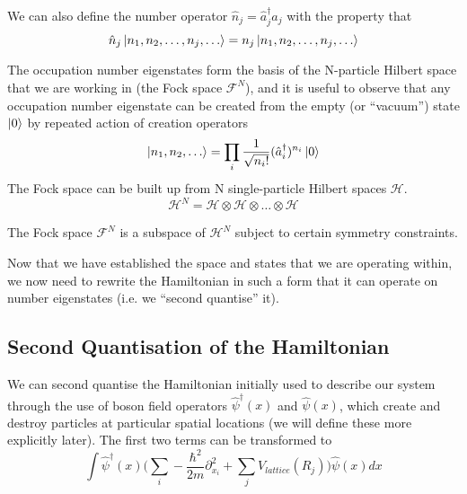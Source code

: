 \documentclass[a4paper,10pt]{article}
\begin{document}
We can also define the number operator $\hat{n}_j=\hat{a}_{j}^{\dagger}\hat{a}_j$ with the property that
\begin{equation}
 \hat{n}_{j}\ket{n_1,n_2,\dots,n_{j},\dots}=n_{j}\ket{n_1,n_2,\dots,n_{j},\dots}
\end{equation}

The occupation number eigenstates form the basis of the N-particle Hilbert space that we are working in (the Fock space $\mathcal{F}^N$), and it 
is useful to observe that any occupation number eigenstate can be created from the empty (or ``vacuum'') state $\ket{0}$ by repeated action of 
creation operators
\begin{equation}
 \ket{n_1,n_2,\dots}=\prod_i\frac{1}{\sqrt{n_i!}}(\hat{a}_i^{\dagger})^{n_i}\ket{0}
\end{equation}
The Fock space can be built up from N single-particle Hilbert spaces $\mathcal{H}$.
\begin{equation}
 \mathcal{H}^N=\mathcal{H}\otimes \mathcal{H} \otimes \dots\otimes \mathcal{H}
\end{equation}

The Fock space $\mathcal{F}^N$ is a subspace of $\mathcal{H}^N$ subject to certain symmetry constraints.

Now that we have established the space and states that we are operating within, we now need to rewrite the Hamiltonian in such a form that it can operate on number eigenstates (i.e. we 
``second quantise'' it).

\subsection{Second Quantisation of the Hamiltonian}
We can second quantise the Hamiltonian initially used to describe our system through the use of boson field operators $\hat{\psi}^{\dagger}(x)$ and $\hat{\psi}(x)$, which create and destroy 
particles at particular spatial locations (we will define these more explicitly later). The first two terms can be transformed to %
\begin{equation}
 \int  \hat{\psi}^{\dagger}(x) \bigg(  \sum_{i}-\frac{\hbar^{2}}{2m}  \partial_{x_{i}}^2+\sum_{j}V_{lattice}(R_{j})  \bigg)    \hat{\psi}(x)dx
\end{equation}
\end{document}
